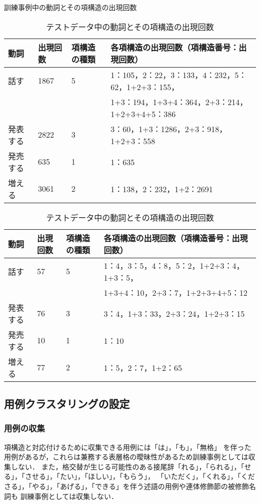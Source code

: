 \begin{table}[htbp]
\begin{center}
\caption{訓練事例中の動詞とその項構造の出現回数}
\small
\begin{tabular}{|l||l|l|l|} \hline
動詞 & 出現回数 & 項構造の種類 & 各項構造の出現回数（項構造番号：出現回数） \\\hline\hline
話す & 1867 & 5 & 1：105，2：22，3：133，4：232，5：62，1+2+3：155， \\
 &  &  & 1+3：194，1+3+4：364，2+3：214，1+2+3+4+5：386 \\\hline
発表する & 2822 & 3 & 3：60，1+3：1286，2+3：918，1+2+3：558 \\\hline
発売する & 635 & 1 & 1：635 \\\hline
増える & 3061 & 2 & 1：138，2：232，1+2：2691 \\\hline
\end{tabular}
\label{tab:train}
\end{center}

\begin{center}
\caption{テストデータ中の動詞とその項構造の出現回数}
\small
\begin{tabular}{|l|l|l|l|} \hline
\multicolumn{1}{|l||}{動詞} & \multicolumn{1}{l|}{出現回数} & 項構造の種類 & 各項構造の出現回数（項構造番号：出現回数） \\\hline\hline
話す & 57 & 5 & 1：4，3：5，4：8，5：2，1+2+3：4，1+3：5，\ \ \ \ \ \ \ \  \ \ \ \ \\
 &  &  & 1+3+4：10，2+3：7，1+2+3+4+5：12 \\\hline
発表する & 76 & 3 & 3：4，1+3：33，2+3：24，1+2+3：15 \\\hline
発売する & 10 & 1 & 1：10 \\\hline
増える & 77 & 2 & 1：5，2：7，1+2：65 \\\hline
\end{tabular}
\label{tab:test}
\end{center}
\end{table}


\subsection{用例クラスタリングの設定}
\label{ssec:class}

\subsubsection{用例の収集}

項構造と対応付けるために収集できる用例には「は」，「も」，「無格」
を伴った用例があるが，これらは兼務する表層格の曖昧性があるため訓練事例としては収集しない．
また，格交替が生じる可能性のある接尾辞「れる」，「られる」，「せる」，「させる」，「たい」，「ほしい」，「もらう」，
「いただく」，「くれる」，「くださる」，「やる」，「あげる」，「できる」を伴う述語の用例や連体修飾節の被修飾名詞も
訓練事例としては収集しない．

